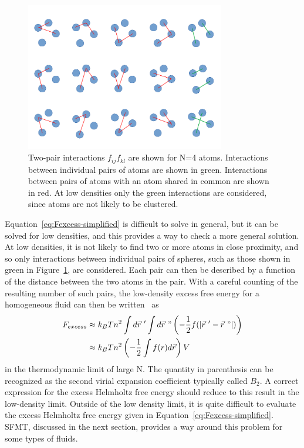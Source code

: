 \documentclass[double,12pt]{beavtex}
\begin{document}
  \begin{figure}
    \centering
    \includegraphics[height=6.5cm]{figs/diagrammic.pdf}
    \caption{Two-pair interactions $f_{ij}f_{kl}$ are shown for N=4 atoms. 
    Interactions between individual pairs of atoms are shown in green. 
    Interactions between pairs of atoms with an atom shared in common 
    are shown in red. At low densities only the green interactions
    are considered, since atoms are not likely to be clustered.}
    \label{fig:diagrammic}
  \end{figure}

Equation~\ref{eq:Fexcess-simplified} is difficult to solve in general, 
but it can be solved for low densities, and this provides a way to check
a more general solution.
At low densities, it is not likely to find two or more atoms in close 
proximity, and so only interactions between individual pairs of spheres, 
such as those shown in green in Figure~\ref{fig:diagrammic}, are considered.
Each pair can then be described by a function of the distance between the 
two atoms in the pair. 
With a careful counting of the resulting number of such pairs, the 
low-density excess free energy for a homogeneous fluid can then be 
written~\cite{schroeder} as
\begin{align}\label{eq:Fexcess}
    F_{excess} &\approx k_BTn^2\int d\vec {r}~'\int d\vec {r}~"\left(-\frac{1}{2}f(|\vec {r}~'-\vec {r}~"|)\right) \\
               &\approx k_BTn^2\left(-\frac{1}{2}\int{f(r)}{d\vec{r}}\right)V
\end{align} 
in the thermodynamic limit of large N. 
The quantity in parenthesis can be recognized 
as the second virial expansion coefficient typically called $B_2$. 
A correct expression for the excess Helmholtz free energy should 
reduce to this result in the low-density limit. 
Outside of the low density limit, it is quite difficult to evaluate the 
excess Helmholtz free energy given in Equation~\ref{eq:Fexcess-simplified}. 
SFMT, discussed in the next section, provides a way around this problem
for some types of fluids.
\end{document}
